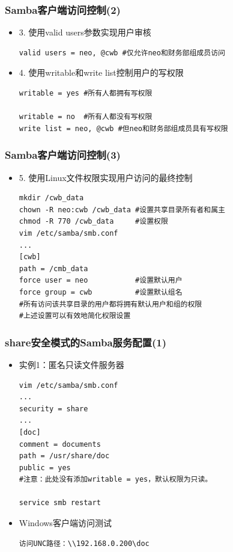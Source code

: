 \documentclass[xcolor=svgnames,presentation]{beamer}
\begin{document}
\begin{frame}[fragile]
\frametitle{Samba客户端访问控制(2)}
\label{sec-2-18}
\begin{itemize}

\item 3. 使用valid users参数实现用户审核\\
\label{sec-2-18-1}%
\begin{verbatim}
valid users = neo, @cwb #仅允许neo和财务部组成员访问
\end{verbatim}

\item 4. 使用writable和write list控制用户的写权限\\
\label{sec-2-18-2}%
\begin{verbatim}
writable = yes #所有人都拥有写权限

writable = no  #所有人都没有写权限
write list = neo, @cwb #但neo和财务部组成员具有写权限
\end{verbatim}
\end{itemize} %
\end{frame}
\begin{frame}[fragile]
\frametitle{Samba客户端访问控制(3)}
\label{sec-2-19}
\begin{itemize}

\item 5. 使用Linux文件权限实现用户访问的最终控制\\
\label{sec-2-19-1}%
\begin{verbatim}
mkdir /cwb_data
chown -R neo:cwb /cwb_data #设置共享目录所有者和属主
chmod -R 770 /cwb_data     #设置权限
vim /etc/samba/smb.conf
...
[cwb]
path = /cmb_data
force user = neo           #设置默认用户
force group = cwb          #设置默认组名
#所有访问该共享目录的用户都将拥有默认用户和组的权限
#上述设置可以有效地简化权限设置
\end{verbatim}
\end{itemize} %
\end{frame}
\begin{frame}[fragile]
\frametitle{share安全模式的Samba服务配置(1)}
\label{sec-2-20}
\begin{itemize}

\item 实例1：匿名只读文件服务器\\
\label{sec-2-20-1}%
\begin{verbatim}
vim /etc/samba/smb.conf
...
security = share
...
[doc]
comment = documents
path = /usr/share/doc
public = yes
#注意：此处没有添加writable = yes，默认权限为只读。

service smb restart
\end{verbatim}

\item Windows客户端访问测试\\
\label{sec-2-20-2}%
\begin{verbatim}
访问UNC路径：\\192.168.0.200\doc
\end{verbatim}
\end{itemize} %
\end{frame}
\end{document}
